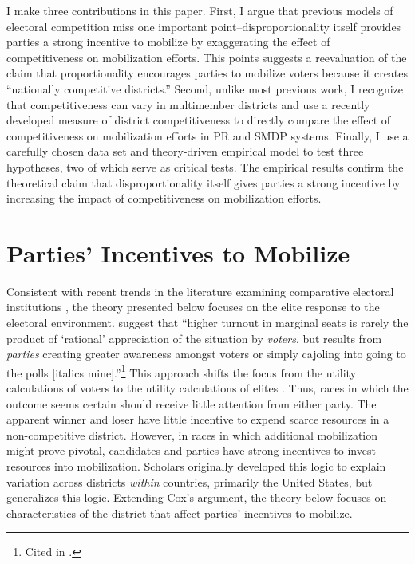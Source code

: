 \documentclass[12pt]{article}
\begin{document}
I make three contributions in this paper. First, I argue that previous models of electoral competition miss one important point--disproportionality itself provides parties a strong incentive to mobilize by exaggerating the effect of competitiveness on mobilization efforts. This points suggests a reevaluation of the claim that proportionality encourages parties to mobilize voters because it creates ``nationally competitive districts.'' Second, unlike most previous work, I recognize that competitiveness can vary in multimember districts and use a recently developed measure of district competitiveness to directly compare the effect of competitiveness on mobilization efforts in PR and SMDP systems. Finally, I use a carefully chosen data set and theory-driven empirical model to test three hypotheses, two of which serve as critical tests. The empirical results confirm the theoretical claim that disproportionality itself gives parties a strong incentive by increasing the impact of competitiveness on mobilization efforts.

\section*{Parties' Incentives to Mobilize}

Consistent with recent trends in the literature examining comparative electoral institutions \citep{Cox1999, Selb2009}, the theory presented below focuses on the elite response to the electoral environment. \cite{DenverHands1974} suggest that ``higher turnout in marginal seats is rarely the product of `rational' appreciation of the situation by \textit{voters}, but results from \textit{parties} creating greater awareness amongst voters or simply cajoling into going to the polls [italics mine].''\footnote{Cited in \cite{Cox1999}.}  This  approach shifts the focus from the utility calculations of voters to the utility calculations of elites \citep{CoxMunger1989, Cox1999}. Thus, races in which the outcome seems certain should receive little attention from either party. The apparent winner and loser have little incentive to expend scarce resources in a non-competitive district. However, in races in which additional mobilization might prove pivotal, candidates and parties have strong incentives to invest resources into mobilization. Scholars originally developed this logic to explain variation across districts \textit{within} countries, primarily the United States, but \cite{Cox1999} generalizes this logic. Extending Cox's argument, the theory below focuses on characteristics of the district that affect parties' incentives to mobilize.
\end{document}
